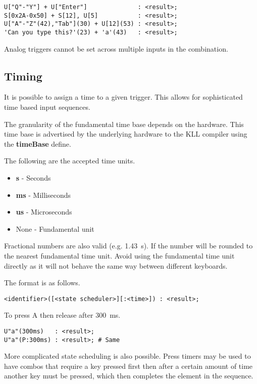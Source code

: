 \documentclass{kiibohd-template}
\begin{document}
\begin{lstlisting}
U["Q"-"Y"] + U["Enter"]              : <result>;
S[0x2A-0x50] + S[12], U[5]           : <result>;
U["A"-"Z"(42),"Tab"](30) + U[12](53) : <result>;
'Can you type this?'(23) + 'a'(43)   : <result>;
\end{lstlisting}

Analog triggers cannot be set across multiple inputs in the combination.


\subsection{Timing}
\label{subsec:trigtiming}

It is possible to assign a time to a given trigger.
This allows for sophisticated time based input sequences.

The granularity of the fundamental time base depends on the hardware.
This time base is advertised by the underlying hardware to the KLL compiler using the \textbf{timeBase} define.

The following are the accepted time units.
\begin{itemize}
	\item \textbf{s} - Seconds
	\item \textbf{ms} - Milliseconds
	\item \textbf{us} - Microseconds
	\item None - Fundamental unit
\end{itemize}

Fractional numbers are also valid (e.g. 1.43~s).
If the number will be rounded to the nearest fundamental time unit.
Avoid using the fundamental time unit directly as it will not behave the same way between different keyboards.

The format is as follows.

\begin{lstlisting}
<identifier>([<state scheduler>][:<time>]) : <result>;
\end{lstlisting}

To press A then release after 300~ms.

\begin{lstlisting}
U"a"(300ms)   : <result>;
U"a"(P:300ms) : <result>; # Same
\end{lstlisting}

More complicated state scheduling is also possible.
Press timers may be used to have combos that require a key pressed first then after a certain amount of time another key must be pressed, which then completes the element in the sequence.
\end{document}

